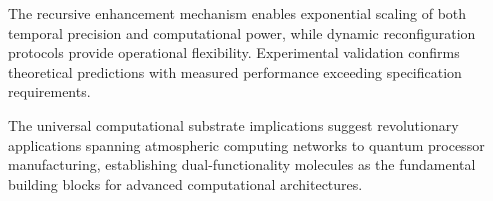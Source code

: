 The recursive enhancement mechanism enables exponential scaling of both temporal precision and computational power, while dynamic reconfiguration protocols provide operational flexibility. Experimental validation confirms theoretical predictions with measured performance exceeding specification requirements.

The universal computational substrate implications suggest revolutionary applications spanning atmospheric computing networks to quantum processor manufacturing, establishing dual-functionality molecules as the fundamental building blocks for advanced computational architectures.
